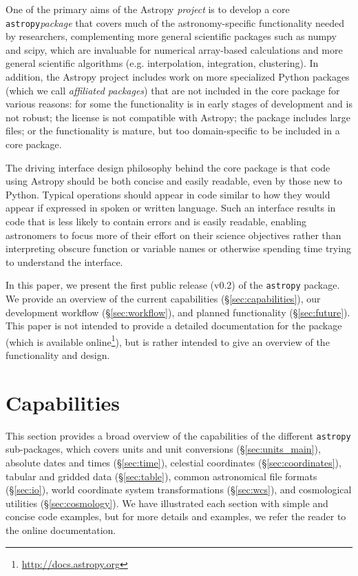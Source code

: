 \documentclass[traditabstract]{aa}
\newcommand{\astropy}{\texttt{astropy}\xspace}
\begin{document}
One of the primary aims of the Astropy \textit{project} is to develop a core \astropy \textit{package}
that covers much of the astronomy-specific functionality needed by
researchers, complementing more general scientific packages such as
\gls{numpy} and \gls{scipy}, which are invaluable for numerical array-based
calculations and more general scientific algorithms (e.g. interpolation,
integration, clustering). 
In addition, the Astropy project includes work on more specialized Python packages (which
we call \textit{affiliated packages}) that are not included in the core
package for various reasons: for some the functionality is in early stages of
development and is not robust; the license is not compatible with Astropy;
the package includes large files; or the functionality is mature, but too
domain-specific to be included in a core package.

The driving interface design philosophy behind the core package is that code
using Astropy should be both concise and easily readable, even by those new to Python. Typical
operations should appear in code similar to how they would appear if expressed
in spoken or written language. Such an interface results in code that is
less likely to contain errors and is easily readable, enabling astronomers to focus more of their effort on their
science objectives rather than interpreting obscure function or variable names
or otherwise spending time trying to understand the interface.

In this paper, we present the first public release (v0.2) of the \astropy
package. We provide an overview of the current capabilities
(\S\ref{sec:capabilities}), our development workflow (\S\ref{sec:workflow}),
and planned functionality (\S\ref{sec:future}). This paper is not intended to
provide a detailed documentation for the package (which is available
online\footnote{\url{http://docs.astropy.org}}), but is rather intended to
give an overview of the functionality and design.

\section{Capabilities}

This section provides a broad overview of the capabilities of the different \astropy sub-packages, which covers units and unit conversions (\S\ref{sec:units_main}), absolute dates and times (\S\ref{sec:time}), celestial coordinates (\S\ref{sec:coordinates}), tabular and gridded data (\S\ref{sec:table}), common astronomical file formats (\S\ref{sec:io}), world coordinate system transformations (\S\ref{sec:wcs}), and cosmological utilities (\S\ref{sec:cosmology}). We have illustrated each section with simple and concise code examples, but for more details and examples, we refer the reader to the online documentation\footnotemark[4].
\end{document}
